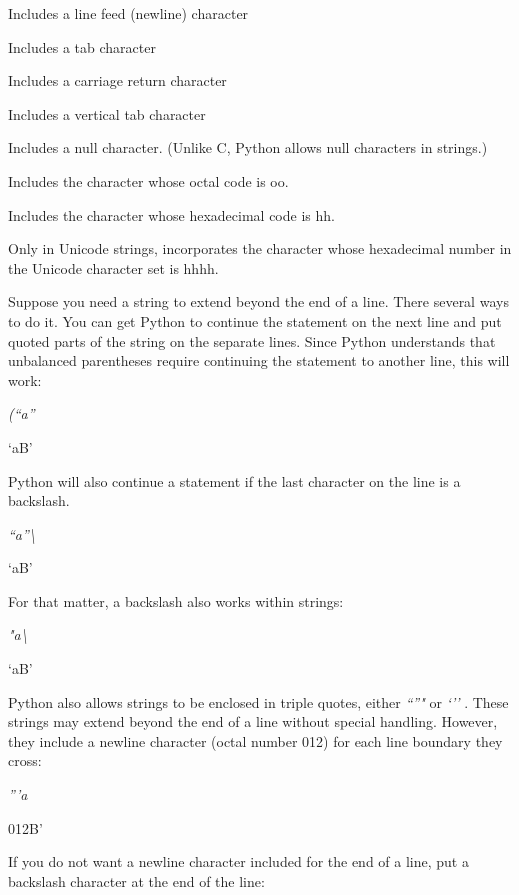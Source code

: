 Includes a line feed (newline)
character



Includes a tab character



Includes a carriage return
character



Includes a vertical tab character



Includes a null character. (Unlike
C, Python allows null characters in strings.)



Includes the character whose octal
code is oo.



Includes the character whose
hexadecimal code is hh.



Only in Unicode strings,
incorporates the character whose hexadecimal number in the Unicode
character set is hhhh.

Suppose you need a string to extend
beyond the end of a line. There several ways to do it. You can get
Python to continue the statement on the next line and put quoted parts
of the string on the separate lines. Since Python understands that
unbalanced parentheses require continuing the statement to another line,
this will work:


\emph{(``a''}



`aB'

Python will also continue a
statement if the last character on the line is a backslash.


\emph{``a''\textbackslash{}}



`aB'

For that matter, a backslash also
works within strings:


\emph{"a\textbackslash{}}



`aB'

Python also allows strings to be
enclosed in triple quotes, either \emph{``''"} or \emph{`''} . These
strings may extend beyond the end of a line without special handling.
However, they include a newline character (octal number 012) for each
line boundary they cross:


\emph{'''a}



012B'

If you do not want a newline
character included for the end of a line, put a backslash character at
the end of the line:


